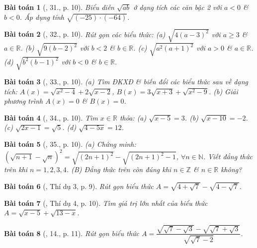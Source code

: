 \documentclass{article}
\newtheorem{baitoan}{Bài toán}
\begin{document}
\begin{baitoan}[\cite{SBT_Toan_9_tap_1}, 31., p. 10]
	Biểu diễn $\sqrt{ab}$ ở dạng tích các căn bậc 2 với $a < 0$ \& $b < 0$. Áp dụng tính $\sqrt{(-25)\cdot(-64)}$.
\end{baitoan}

\begin{baitoan}[\cite{SBT_Toan_9_tap_1}, 32., p. 10]
	Rút gọn các biểu thức: (a) $\sqrt{4(a - 3)^2}$ với $a\ge3$ \& $a\in\mathbb{R}$. (b) $\sqrt{9(b - 2)^2}$ với $b < 2$ \& $b\in\mathbb{R}$. (c) $\sqrt{a^2(a + 1)^2}$ với $a > 0$ \& $a\in\mathbb{R}$. (d) $\sqrt{b^2(b - 1)^2}$ với $b < 0$ \& $b\in\mathbb{R}$.
\end{baitoan}

\begin{baitoan}[\cite{SBT_Toan_9_tap_1}, 33., p. 10]
	(a) Tìm ĐKXĐ \& biến đổi các biểu thức sau về dạng tích: $A(x) = \sqrt{x^2 - 4} + 2\sqrt{x - 2}$, $B(x) = 3\sqrt{x + 3} + \sqrt{x^2 - 9}$. (b) Giải phương trình $A(x) = 0$ \& $B(x) = 0$.
\end{baitoan}

\begin{baitoan}[\cite{SBT_Toan_9_tap_1}, 34., p. 10]
	Tìm $x\in\mathbb{R}$ thỏa: (a) $\sqrt{x - 5} = 3$. (b) $\sqrt{x - 10} = -2$. (c) $\sqrt{2x - 1} = \sqrt{5}$. (d) $\sqrt{4 - 5x} = 12$.
\end{baitoan}

\begin{baitoan}[\cite{SBT_Toan_9_tap_1}, 35., p. 10]
	(a) Chứng minh: $\left(\sqrt{n + 1} - \sqrt{n}\right)^2 = \sqrt{(2n + 1)^2} - \sqrt{(2n + 1)^2 - 1}$, $\forall n\in\mathbb{N}$. Viết đẳng thức trên khi $n = 1,2,3,4$. (B) Đẳng thức trên còn đúng khi $n\in\mathbb{Z}$ \& $n\in\mathbb{R}$ không?
\end{baitoan}

\begin{baitoan}[\cite{Tuyen_Toan_9}, Thí dụ 3, p. 9]
	Rút gọn biểu thức $A = \sqrt{4 + \sqrt{7}} - \sqrt{4 - \sqrt{7}}$.
\end{baitoan}

\begin{baitoan}[\cite{Tuyen_Toan_9}, Thí dụ 4, p. 10]
	Tìm giá trị lớn nhất của biểu thức $A = \sqrt{x - 5} + \sqrt{13 - x}$.
\end{baitoan}

\begin{baitoan}[\cite{Tuyen_Toan_9}, 14., p. 11]
	Rút gọn biểu thức $A = \dfrac{\sqrt{\sqrt{7} - \sqrt{3}} - \sqrt{\sqrt{7} + \sqrt{3}}}{\sqrt{\sqrt{7} - 2}}$.
\end{baitoan}
\end{document}
